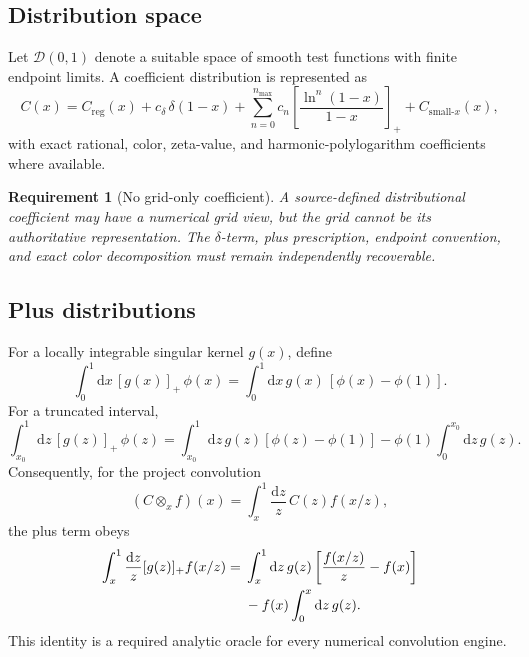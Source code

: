 \documentclass[11pt]{article}
\newtheorem{requirement}[definition]{Requirement}
\newcommand{\dd}{\mathrm{d}}
\newcommand{\otimesx}{\mathbin{\otimes_x}}
\begin{document}
\subsection{Distribution space}

Let \(\mathscr D(0,1)\) denote a suitable space of smooth test functions with finite endpoint limits.  A coefficient distribution is represented as
\begin{equation}
 C(x)
 =
 C_{\mathrm{reg}}(x)
 +c_\delta\,\delta(1-x)
 +\sum_{n=0}^{n_{\max}}
 c_n
 \left[
 \frac{\ln^n(1-x)}{1-x}
 \right]_+
 +C_{\mathrm{small}\text{-}x}(x),
 \label{eq:distribution-decomposition}
\end{equation}
with exact rational, color, zeta-value, and harmonic-polylogarithm coefficients where available.

\begin{requirement}[No grid-only coefficient]
A source-defined distributional coefficient may have a numerical grid view, but the grid cannot be its authoritative representation.  The \(\delta\)-term, plus prescription, endpoint convention, and exact color decomposition must remain independently recoverable.
\end{requirement}

\subsection{Plus distributions}

For a locally integrable singular kernel \(g(x)\), define
\begin{equation}
 \int_0^1\dd x\,[g(x)]_+\,\phi(x)
 =
 \int_0^1\dd x\,g(x)\,[\phi(x)-\phi(1)].
 \label{eq:plus-definition}
\end{equation}
For a truncated interval,
\begin{equation}
 \int_{x_0}^1\dd z\,[g(z)]_+\,\phi(z)
 =
 \int_{x_0}^1\dd z\,g(z)[\phi(z)-\phi(1)]
 -\phi(1)\int_0^{x_0}\dd z\,g(z).
 \label{eq:plus-truncated}
\end{equation}
Consequently, for the project convolution
\begin{equation}
 (C\otimesx f)(x)
 =
 \int_x^1\frac{\dd z}{z}\,C(z)f(x/z),
 \label{eq:convolution}
\end{equation}
the plus term obeys
\begin{align}
 \int_x^1\frac{\dd z}{z}[g(z)]_+f(x/z)
 ={}&
 \int_x^1\dd z\,g(z)
 \left[
 \frac{f(x/z)}{z}-f(x)
 \right]
 \notag\\
 &-f(x)\int_0^x\dd z\,g(z).
 \label{eq:plus-convolution}
\end{align}
This identity is a required analytic oracle for every numerical convolution engine.
\end{document}
